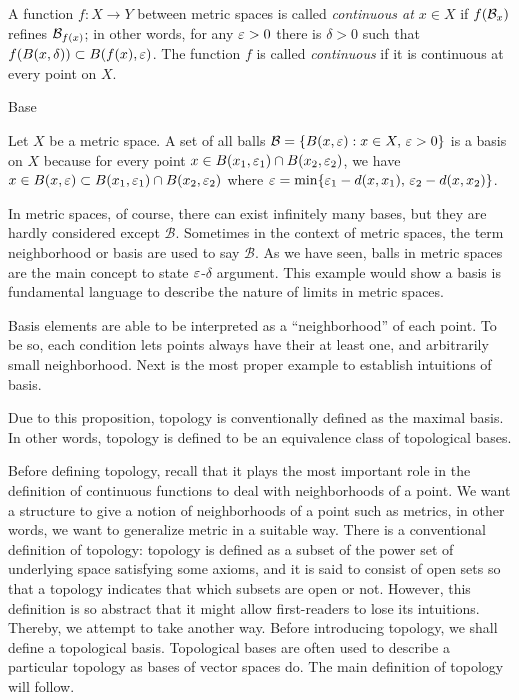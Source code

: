 \documentclass{../crs}
\begin{document}
\begin{defn}
A function $f:X\to Y$ between metric spaces is called \emph{continuous at $x\in X$} if $f(\mathcal{B}_x)$ refines $\mathcal{B}_{f(x)}$; in other words, for any $\varepsilon>0$ there is $\delta>0$ such that $f(B(x,\delta))\subset B(f(x),\varepsilon)$.
The function $f$ is called \emph{continuous} if it is continuous at every point on $X$.
\end{defn}










Base
\begin{ex}
Let $X$ be a metric space.
A set of all balls $\mathcal{B}=\{B(x,\varepsilon):x\in X,\,\varepsilon>0\}$ is a basis on $X$ because for every point $x\in B(x_1,\varepsilon_1)\cap B(x_2,\varepsilon_2)$, we have $x\in B(x,\varepsilon)\subset B(x_1,\varepsilon_1)\cap B(x_2,\varepsilon_2)$ where $\varepsilon=\min\{\varepsilon_1-d(x,x_1),\,\varepsilon_2-d(x,x_2)\}$.
\end{ex}

\begin{rmk}
In metric spaces, of course, there can exist infinitely many bases, but they are hardly considered except $\mathcal{B}$.
Sometimes in the context of metric spaces, the term neighborhood or basis are used to say $\mathcal{B}$.
As we have seen, balls in metric spaces are the main concept to state $\varepsilon$-$\delta$ argument.
This example would show a basis is fundamental language to describe the nature of limits in metric spaces.
\end{rmk}
Basis elements are able to be interpreted as a ``neighborhood'' of each point.
To be so, each condition lets points always have their at least one, and arbitrarily small neighborhood.
Next is the most proper example to establish intuitions of basis.


Due to this proposition, topology is conventionally defined as the maximal basis.
In other words, topology is defined to be an equivalence class of topological bases.




Before defining topology, recall that it plays the most important role in the definition of continuous functions to deal with neighborhoods of a point.
We want a structure to give a notion of neighborhoods of a point such as metrics, in other words, we want to generalize metric in a suitable way.
There is a conventional definition of topology: topology is defined as a subset of the power set of underlying space satisfying some axioms, and it is said to consist of open sets so that a topology indicates that which subsets are open or not.
However, this definition is so abstract that it might allow first-readers to lose its intuitions.
Thereby, we attempt to take another way.
Before introducing topology, we shall define a topological basis.
Topological bases are often used to describe a particular topology as bases of vector spaces do.
The main definition of topology will follow.
\end{document}
